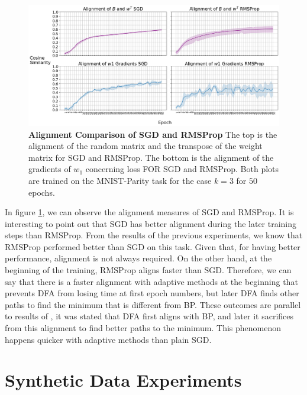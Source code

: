 \documentclass[a4paper, nobind]{templates/ociamthesis}
\begin{document}
\begin{figure}

{\centering \includegraphics[width=1\linewidth]{figures/3_k3_SGD_RMSProp_DFA_Alingment} 

}

\caption[Alignment Comparison of SGD and RMSProp]{\textbf{Alignment Comparison of SGD and RMSProp} \newline The top is the alignment of the random matrix and the transpose of the weight matrix for SGD and RMSProp. The bottom is the alignment of the gradients of $w_1$ concerning loss FOR SGD and RMSProp. Both plots are trained on the MNIST-Parity task for the case $k=3$ for $50$ epochs.}\label{fig:Alignment}
\end{figure}

\noindent In figure \ref{fig:Alignment}, we can observe the alignment measures of SGD and RMSProp. It is interesting to point out that SGD has better alignment during the later training steps than RMSProp. From the results of the previous experiments, we know that RMSProp performed better than SGD on this task. Given that, for having better performance, alignment is not always required. On the other hand, at the beginning of the training, RMSProp aligns faster than SGD. Therefore, we can say that there is a faster alignment with adaptive methods at the beginning that prevents DFA from losing time at first epoch numbers, but later DFA finds other paths to find the minimum that is different from BP. These outcomes are parallel to results of \cite{refinetti2021align}, it was stated that DFA first aligns with BP, and later it sacrifices from this alignment to find better paths to the minimum. This phenomenon happens quicker with adaptive methods than plain SGD.

\hypertarget{synthetic-data-experiments}{%
\section{Synthetic Data Experiments}\label{synthetic-data-experiments}}
\end{document}
